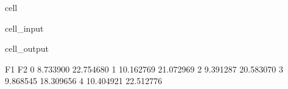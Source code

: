\documentclass[letterpaper,10pt,english]{jupyterBook}
\begin{document}
\begin{sphinxuseclass}{cell}\begin{sphinxVerbatimInput}

\begin{sphinxuseclass}{cell_input}
\begin{sphinxVerbatim}[commandchars=\\\{\}]
   
  \PYG{p}{[}\PYG{p}{]}
  \PYG{p}{[}\PYG{p}{[}\PYG{p}{]}\PYG{p}{[}\PYG{p}{]}\PYG{p}{]}

  
  \PYG{p}{[}\PYG{p}{]}
     \PYG{p}{[}\PYG{p}{]}
\end{sphinxVerbatim}

\end{sphinxuseclass}\end{sphinxVerbatimInput}
\begin{sphinxVerbatimOutput}

\begin{sphinxuseclass}{cell_output}
\begin{sphinxVerbatim}[commandchars=\\\{\}]
       \PYGZdl{}F\PYGZus{}1\PYGZdl{}      \PYGZdl{}F\PYGZus{}2\PYGZdl{}
0   8.733900  22.754680
1  10.162769  21.072969
2   9.391287  20.583070
3   9.868545  18.309656
4  10.404921  22.512776
\end{sphinxVerbatim}

\end{sphinxuseclass}\end{sphinxVerbatimOutput}

\end{sphinxuseclass}
\end{document}
